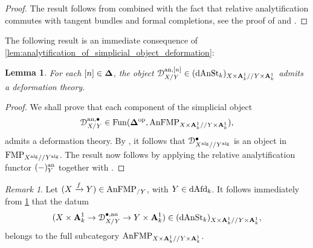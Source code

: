 \documentclass[10pt,a4paper,reqno]{amsart} %
\theoremstyle{plain}
\newtheorem{lem}[thm]{Lemma}
\theoremstyle{definition}
\theoremstyle{remark}
\newtheorem{rem}[thm]{Remark}
\numberwithin{equation}{section}
\begin{document}
\begin{proof}
    The result follows from \cite[Proposition 9.2.3.6]{Gaitsgory_Study_II} combined with the fact that relative analytification
    commutes with tangent bundles and formal completions, see the proof of \cite[Lemma 5.31]{Holstein_Analytification_of_mapping_stacks}
    and \cite[Corollary 5.20]{Holstein_Analytification_of_mapping_stacks}.
\end{proof}

The following result is an immediate consequence of \cref{lem:analytification_of_simplicial_object_deformation}:

\begin{lem} \label{lem:deformation_theory_for_D^an_bullet_X/Y}
    For each $[n] \in \bm{\Delta}$, the object $\mathcal D_{X/Y}^{\mathrm{an}, [n]} \in (\mathrm{dAnSt}_k)_{X \times \mathbf A^1_k/ /Y \times \mathbf A^1_k}$ admits a deformation theory.
\end{lem}

\begin{proof}
    We shall prove that each component of the simplicial object
        \[\mathcal D^{ \mathrm{an}, \bullet}_{X/ Y} \in \operatorname{Fun}(\bm{\Delta} ^\mathrm{op}, \mathrm{AnFMP}_{X \times \mathbf A^1_k/ /Y\times\mathbf A^1_k}),\]
    admits a deformation theory.
    By \cite[Lemma 2.3.2]{Gaitsgory_Study_II}, it follows
    that $\mathcal D^\bullet_{X^\mathrm{alg}/ /Y^\mathrm{alg}}$ is an object in $\mathrm{FMP}_{X^\mathrm{alg}/ /Y^\mathrm{alg}}$. The result now follows by applying the relative analytification functor $(-)_Y^\mathrm{an}$ together with
    \cite[Proposition 6.10]{Porta_Yu_NQK}.
\end{proof}

\begin{rem} \label{rem:D_X/Y_lives_over_and_under_XxA^1_as_anFMP} Let $(X \xrightarrow{f} Y) \in \mathrm{AnFMP}_{/ Y}$, with $Y \in \mathrm{dAfd}_k$.
    It follows immediately from \cref{lem:deformation_theory_for_D^an_bullet_X/Y} that the datum
        \[
            (X \times \mathbf A^1_k \to \mathcal D^{\bullet, \mathrm{an}}_{X/ Y} \to Y \times \mathbf A^1_k) \in (\mathrm{dAnSt}_k)_{X \times \mathbf A^1_k/ /Y\times\mathbf A^1_k},  
        \]
    belongs to the full subcategory $\mathrm{AnFMP}_{X\times\mathbf A^1_k/ /Y\times\mathbf A^1_k}$.
\end{rem}
\end{document}
